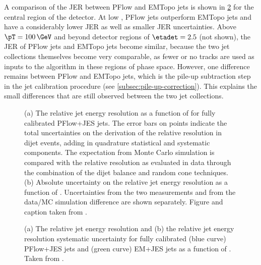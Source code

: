 A comparison of the JER between PFlow and EMTopo jets is shown in \cref{fig:jer-combination-results} for the central region of the detector.
At low \pT, PFlow jets outperform EMTopo jets and have a considerably lower JER as well as smaller JER uncertainties.
Above $\pT=100\,\GeV$ and beyond detector regions of $\etadet = 2.5$ (not shown), the JER of PFlow jets and EMTopo jets become similar, because the two jet collections themselves become very comparable, as fewer or no tracks are used as inputs to the \antikt algorithm in these regions of phase space. However, one difference remains between PFlow and EMTopo jets, which is the pile-up subtraction step in the jet calibration procedure (see \cref{subsec:pile-up-correction}). This explains the small differences that are still observed between the two jet collections.

\FloatBarrier
\begin{figure}[t]
    \caption[The relative JER and the absolute uncertainty in the relative JER.]{(a) The relative jet energy resolution as a function of \pT for fully calibrated PFlow+JES jets. The error bars on points indicate the total uncertainties on the derivation of the relative resolution in dijet events, adding in quadrature statistical and systematic components. The expectation from Monte Carlo simulation is compared with the relative resolution as evaluated in data through the combination of the dijet balance and random cone techniques. (b) Absolute uncertainty on the relative jet energy resolution as a function of \pTjet. Uncertainties from the two \insitu measurements and from the data/MC simulation difference are shown separately. Figure and caption taken from .}
    \label{fig:jer-combination-incl-noise-term}
\end{figure}
\begin{figure}[t]
    \caption[The relative JER for fully calibrated jets.]{(a) The relative jet energy resolution and (b) the relative jet energy resolution systematic uncertainty for fully calibrated (blue curve) PFlow+JES jets and (green curve) EM+JES jets as a function of \pTjet. Taken from .}
    \label{fig:jer-combination-results}
\end{figure}


